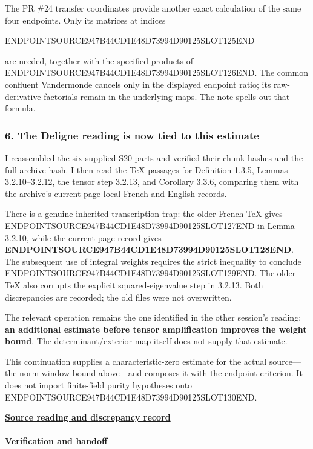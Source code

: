 The PR \#24 transfer coordinates provide another exact calculation of the same four endpoints. Only its matrices at indices

ENDPOINTSOURCE947B44CD1E48D73994D90125SLOT125END

are needed, together with the specified products of ENDPOINTSOURCE947B44CD1E48D73994D90125SLOT126END. The common confluent Vandermonde cancels only in the displayed endpoint ratio; its raw-derivative factorials remain in the underlying maps. The note spells out that formula.

\subsubsection{6. The Deligne reading is now tied to this estimate}\label{endpoint-user_norm_original--the-deligne-reading-is-now-tied-to-this-estimate}

I reassembled the six supplied S20 parts and verified their chunk hashes and the full archive hash. I then read the TeX passages for Definition 1.3.5, Lemmas 3.2.10--3.2.12, the tensor step 3.2.13, and Corollary 3.3.6, comparing them with the archive's current page-local French and English records.

There is a genuine inherited transcription trap: the older French TeX gives ENDPOINTSOURCE947B44CD1E48D73994D90125SLOT127END in Lemma 3.2.10, while the current page record gives \textbf{ENDPOINTSOURCE947B44CD1E48D73994D90125SLOT128END}. The subsequent use of integral weights requires the strict inequality to conclude ENDPOINTSOURCE947B44CD1E48D73994D90125SLOT129END. The older TeX also corrupts the explicit squared-eigenvalue step in 3.2.13. Both discrepancies are recorded; the old files were not overwritten.

The relevant operation remains the one identified in the other session's reading: \textbf{an additional estimate before tensor amplification improves the weight bound}. The determinant/exterior map itself does not supply that estimate.

This continuation supplies a characteristic-zero estimate for the actual source---the norm-window bound above---and composes it with the endpoint criterion. It does not import finite-field purity hypotheses onto ENDPOINTSOURCE947B44CD1E48D73994D90125SLOT130END.

\href{sources/web_arithmetic_endpoint_delivery/Tau_Arithmetic_Endpoint_Bounds/SOURCE_REVIEW.md}{\textbf{Source reading and discrepancy record}}

\paragraph{Verification and handoff}\label{endpoint-user_norm_original--verification-and-handoff}

